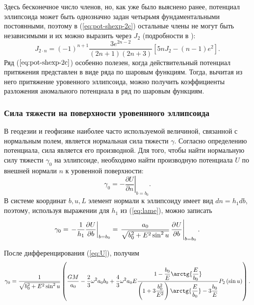 \documentclass[11pt, a4paper,addpoints]{exam}
\theoremstyle{remark}
\begin{document}
Здесь бесконечное число членов, но, как уже было выяснено ранее, потенциал эллипсоида может быть
однозначно задан четырьмя фундаментальными постоянными, поэтому в (\ref{eq:pot-shexp-2c}) остальные
члены не могут быть независимыми и их можно выразить через $J_2$ (подробности в \cite{Moritz2007, Pellinen1978,
Ogorodova2006}):
\begin{equation}
    J_{2\cdot n} = \left( -1 \right)^{n + 1} \dfrac{3e^{2n-2}}{\left( 2n+1 \right)\left( 2n+3 \right)}
    \left[ 5nJ_2 - \left( n - 1 \right) e^2 \right].
    \label{eq:jn}
\end{equation}
Ряд ($\ref{eq:pot-shexp-2c}$) особенно полезен, когда действительный потенциал притяжения представлен в виде
ряда по шаровым функциям. Тогда, вычитая из него притяжение уровенного эллипсоида, можно получить
коэффициенты разложения аномального потенциала в ряд по шаровым функциям.

\subsubsection*{Сила тяжести на поверхности уровеннного эллипсоида}
В геодезии и геофизике наиболее часто используемой величиной, связанной с нормальным полем, является
нормальная сила тяжести $\gamma$. Согласно определению потенциала, сила является его производной.
Для того, чтобы найти нормальную силу тяжести $\gamma_0$ на эллипсоиде, необходимо найти производную
потенциала $U$ по внешней нормали $n$ к уровенной поверхности:
\begin{equation*}
    \gamma_0 = \left. -\dfrac{\partial U}{\partial n} \right|_{b = b_0}.
\end{equation*}
В системе координат $b, u, L$ элемент нормали к эллипсоиду имеет вид $dn = h_1 db$, поэтому,
используя выражении для $h_1$ из (\ref{eq:lame}), можно записать
\begin{equation}
    \gamma_0 =  \left. -\dfrac{1}{h_1}\dfrac{\partial U}{\partial b} \right|_{b = b_0} =
        \left. \dfrac{a_0}{\sqrt{b_0^2 + E^2\sin^2{u}}} \dpd{U}{b} \right|_{b=b_0}.
    \label{eq:gamma-0}
\end{equation}

После дифференцирования (\ref{eq:U}), получим
\begin{equation}
    \gamma_0 = \dfrac{1}{\sqrt{b_0^2 + E^2\sin^2{u}}}
    \left( 
        \dfrac{GM}{a_0} - \dfrac{2}{3}\omega^2 a_0 b_0 +
        \dfrac{4}{3}\omega^2 a_0 E
        \dfrac{1 - \dfrac{b_0}{E}\arctg{\dfrac{E}{b_0}}}{
        \left( 1 + 3\dfrac{b_0^2}{E^2} \right)\arctg{\dfrac{E}{b_0}} - 3\dfrac{b_0}{E}}
        P_2 \left( \sin{u} \right)
    \right).
    \label{eq:gamma0}
\end{equation}
\end{document}
